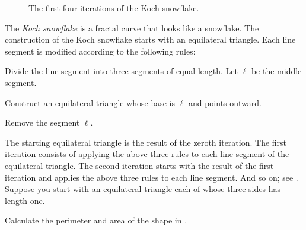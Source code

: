 \documentclass[a4paper,oneside,12pt]{article}
\begin{document}
\begin{problem}
\begin{figure}[!htbp]
{  \label{fig:Koch_snowflake_second_iteration}
}
\qquad
\caption{%
  The first four iterations of the Koch snowflake.
}
\label{fig:Koch_snowflake_first_4_iterations}
\end{figure}

\item The \emph{Koch snowflake} is a fractal curve that looks like a
  snowflake.  The construction of the Koch snowflake starts with an
  equilateral triangle.  Each line segment is modified according to
  the following rules:
  \begin{packedenumeral}
  \item Divide the line segment into three segments of equal length.
    Let $\ell$ be the middle segment.

  \item Construct an equilateral triangle whose base is $\ell$ and
    points outward.

  \item Remove the segment $\ell$.
  \end{packedenumeral}
  The starting equilateral triangle is the result of the zeroth
  iteration.  The first iteration consists of applying the above three
  rules to each line segment of the equilateral triangle.  The second
  iteration starts with the result of the first iteration and applies
  the above three rules to each line segment.  And so on; see
  .  Suppose you start
  with an equilateral triangle each of whose three sides has length
  one.
  \begin{packedenum}
  \item\label{subprob:Koch_snowflake_zeroth_iteration}
    Calculate the perimeter and area of the shape in
    .


\end{packedenum}
\end{problem}
\end{document}
